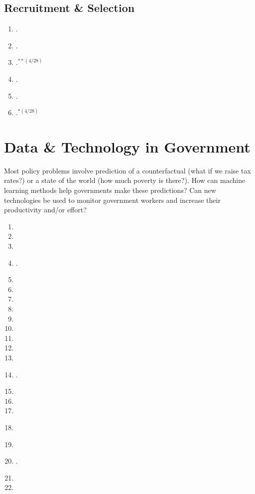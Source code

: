 \documentclass[11pt]{article}
\begin{document}
\subsection{Recruitment \& Selection}

\begin{enumerate}
\item {}.
\item {}.
\item \textbf{}.$^{**(4/28)}$
\item {}.
\item {}.
\item {}.$^{*(4/28)}$
\end{enumerate}

\section{Data \& Technology in Government}
Most policy problems involve prediction of a counterfactual (what if we raise tax rates?) or a state of the world (how much poverty is there?). How can machine learning methods help governments make these predictions? Can new technologies be used to monitor government workers and increase their productivity and/or effort?

\begin{enumerate}
\item {}
\item {}
\item {}
\item {}.
\item {}
\item {}
\item {}
\item {}
\item {}
\item {}
\item {}
\item {}
\item {}
\item {}.
\item {}
\item {}
\item {}
\item \textbf{}
\item \textbf{}
\item {}.
\item {}
\item {}
\end{enumerate}


\end{document}
